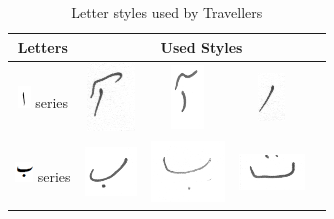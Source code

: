 \begin{table}[h]
\centering
\caption{Letter styles used by Travellers}\label{tab6-trav}
\begin{tabular}{@{}ccccc@{}}
\hline
Letters	& \multicolumn{4}{c}{\textbf{Used Styles}} \\ \hline
\includegraphics[scale=0.50]{alif.png} series & \includegraphics[scale=0.20]{40} & \includegraphics[scale=0.20]{41}  & \includegraphics[scale=0.35]{42}  & \\ 
\hline
\includegraphics[scale=0.50]{bay} series & \includegraphics[scale=0.20]{43} & \includegraphics[scale=0.20]{44}  & \includegraphics[scale=0.20]{45} & \\
\hline

\end{tabular}
\end{table}

